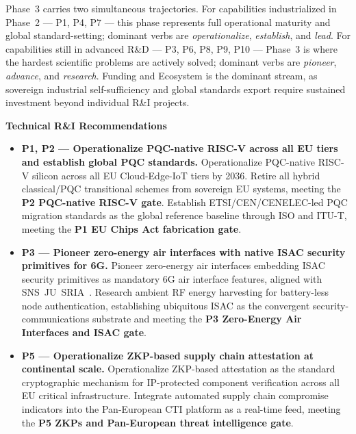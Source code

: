 \documentclass{ieeeaccess}
\begin{document}
Phase~3 carries two simultaneous trajectories. For capabilities
industrialized in Phase~2 --- P1, P4, P7 --- this phase represents full
operational maturity and global standard-setting; dominant verbs are
\emph{operationalize}, \emph{establish}, and \emph{lead}. For capabilities
still in advanced R\&D --- P3, P6, P8, P9, P10 --- Phase~3 is where the
hardest scientific problems are actively solved; dominant verbs are
\emph{pioneer}, \emph{advance}, and \emph{research}. Funding and Ecosystem
is the dominant stream, as sovereign industrial self-sufficiency and global
standards export require sustained investment beyond individual R\&I
projects.

\textbf{Technical R\&I Recommendations}

\begin{itemize}

    \item \textbf{P1, P2 --- Operationalize PQC-native RISC-V across
    all EU tiers and establish global PQC standards.}
    Operationalize PQC-native RISC-V silicon across all EU
    Cloud-Edge-IoT tiers by 2036. Retire all hybrid classical/PQC
    transitional schemes from sovereign EU systems, meeting the
    \textbf{P2 PQC-native RISC-V gate}. Establish
    ETSI/CEN/CENELEC-led PQC migration standards as the global
    reference baseline through ISO and ITU-T, meeting the
    \textbf{P1 EU Chips Act fabrication gate}.

    \item \textbf{P3 --- Pioneer zero-energy air interfaces with
    native ISAC security primitives for 6G.}
    Pioneer zero-energy air interfaces embedding ISAC security
    primitives as mandatory 6G air interface features, aligned with
    SNS~JU~SRIA~\cite{snsju}. Research ambient RF energy harvesting
    for battery-less node authentication, establishing ubiquitous
    ISAC as the convergent security-communications substrate and
    meeting the \textbf{P3 Zero-Energy Air Interfaces and ISAC gate}.

    \item \textbf{P5 --- Operationalize ZKP-based supply chain
    attestation at continental scale.}
    Operationalize ZKP-based attestation as the standard cryptographic
    mechanism for IP-protected component verification across all EU
    critical infrastructure. Integrate automated supply chain
    compromise indicators into the Pan-European CTI platform as a
    real-time feed, meeting the \textbf{P5 ZKPs and Pan-European
    threat intelligence gate}.


\end{itemize}
\end{document}
